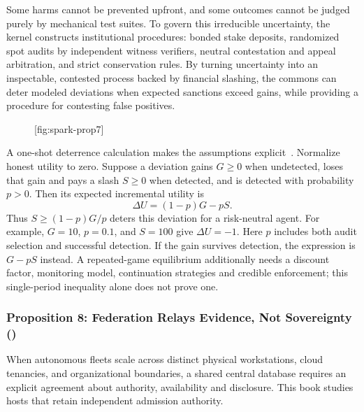 Some harms cannot be prevented upfront, and some outcomes cannot be judged purely by mechanical test suites. To govern this irreducible uncertainty, the kernel constructs institutional procedures: bonded stake deposits, randomized spot audits by independent witness verifiers, neutral contestation and appeal arbitration, and strict conservation rules. By turning uncertainty into an inspectable, contested process backed by financial slashing, the commons can deter modeled deviations when expected sanctions exceed gains, while providing a procedure for contesting false positives.

\begin{figure}[tp]
  \centering
  [fig:spark-prop7]
\end{figure}

A one-shot deterrence calculation makes the assumptions explicit~. Normalize honest utility to zero. Suppose a deviation gains $G\ge0$ when undetected, loses that gain and pays a slash $S\ge0$ when detected, and is detected with probability $p>0$. Then its expected incremental utility is
\begin{equation}
\Delta U=(1-p)G-pS.
\end{equation}
Thus $S\ge(1-p)G/p$ deters this deviation for a risk-neutral agent. For example, $G=10$, $p=0.1$, and $S=100$ give $\Delta U=-1$. Here $p$ includes both audit selection and successful detection. If the gain survives detection, the expression is $G-pS$ instead. A repeated-game equilibrium additionally needs a discount factor, monitoring model, continuation strategies and credible enforcement; this single-period inequality alone does not prove one.

\subsubsection*{Proposition 8: Federation Relays Evidence, Not Sovereignty ()}
When autonomous fleets scale across distinct physical workstations, cloud tenancies, and organizational boundaries, a shared central database requires an explicit agreement about authority, availability and disclosure. This book studies hosts that retain independent admission authority.

